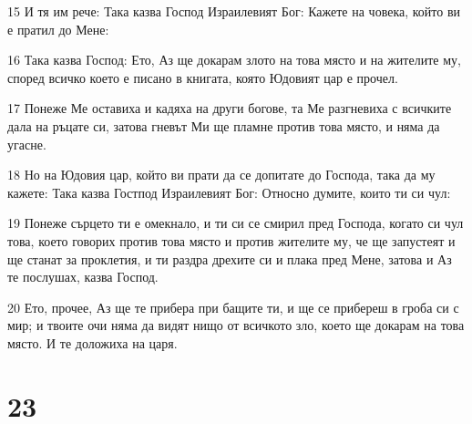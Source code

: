 \par 15 И тя им рече: Така казва Господ Израилевият Бог: Кажете на човека, който ви е пратил до Мене:
\par 16 Така казва Господ: Ето, Аз ще докарам злото на това място и на жителите му, според всичко което е писано в книгата, която Юдовият цар е прочел.
\par 17 Понеже Ме оставиха и кадяха на други богове, та Ме разгневиха с всичките дала на ръцате си, затова гневът Ми ще пламне против това място, и няма да угасне.
\par 18 Но на Юдовия цар, който ви прати да се допитате до Господа, така да му кажете: Така казва Гостпод Израилевият Бог: Относно думите, които ти си чул:
\par 19 Понеже сърцето ти е омекнало, и ти си се смирил пред Господа, когато си чул това, което говорих против това място и против жителите му, че ще запустеят и ще станат за проклетия, и ти раздра дрехите си и плака пред Мене, затова и Аз те послушах, казва Господ.
\par 20 Ето, прочее, Аз ще те прибера при бащите ти, и ще се прибереш в гроба си с мир; и твоите очи няма да видят нищо от всичкото зло, което ще докарам на това място. И те доложиха на царя.

\chapter{23}

